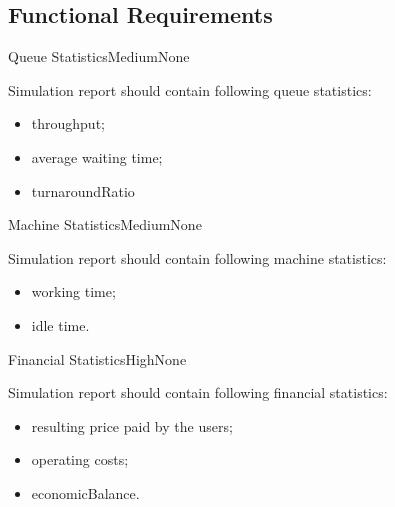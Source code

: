 \subsection*{Functional Requirements}
	\begin{comment}
		$<$Itemize the detailed functional requirements associated with this feature.  
		These are the software capabilities that must be present in order for the user 
		to carry out the services provided by the feature, or to execute the use case.  
		Include how the product should respond to anticipated error conditions or 
		invalid inputs. Requirements should be concise, complete, unambiguous, 
		verifiable, and necessary. Use “TBD” as a placeholder to indicate when necessary 
		information is not yet available.$>$
		
		$<$Each requirement should be uniquely identified with a sequence number or a 
		meaningful tag of some kind.$>$
		
		REQ-1:	REQ-2:
	\end{comment}

	\begin{functional}{Queue Statistics}{Medium}{None}
		\label{fn:reporting-feature:queue-statistics}
		{
			Simulation report should contain following queue statistics:
			\begin{itemize}
				\item \gls{throughput};
				\item average waiting time;
				\item \gls{turnaroundRatio}
			\end{itemize}
		}
	\end{functional}

	\begin{functional}{Machine Statistics}{Medium}{None}
		\label{fn:reporting-feature:machine-statistics}
		{
			Simulation report should contain following machine statistics:
			\begin{itemize}
				\item working time;
				\item idle time.
			\end{itemize}
		}
	\end{functional}

	\begin{functional}{Financial Statistics}{High}{None}
		\label{fn:reporting-feature:financial-statistics}
		{
			Simulation report should contain following financial statistics:
			\begin{itemize}
				\item resulting price paid by the users;
				\item operating costs;
				\item \gls{economicBalance}.
			\end{itemize}
		}
	\end{functional}

